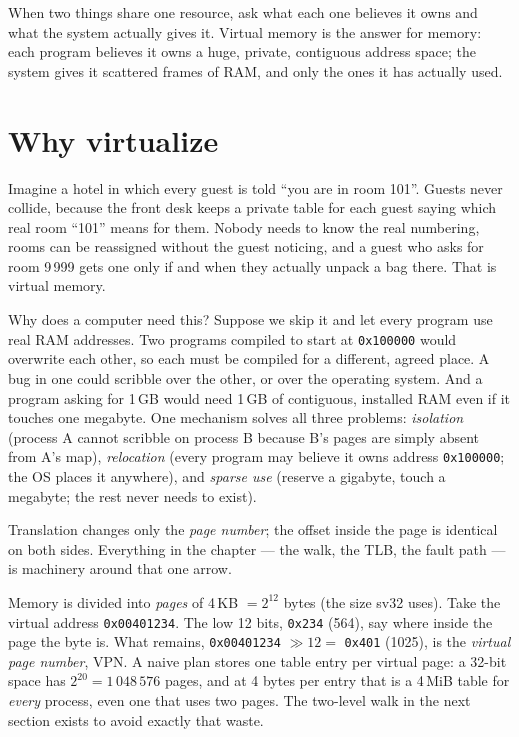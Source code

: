 \begin{rulebox}
When two things share one resource, ask what each one believes it owns
and what the system actually gives it. Virtual memory is the answer for
memory: each program believes it owns a huge, private, contiguous
address space; the system gives it scattered frames of RAM, and only the
ones it has actually used.
\end{rulebox}

\section{Why virtualize}
\label{sec:why11}

Imagine a hotel in which every guest is told ``you are in room 101''.
Guests never collide, because the front desk keeps a private table for
each guest saying which real room ``101'' means for them. Nobody needs
to know the real numbering, rooms can be reassigned without the guest
noticing, and a guest who asks for room 9\,999 gets one only if and when
they actually unpack a bag there. That is virtual memory.

Why does a computer need this? Suppose we skip it and let every program
use real RAM addresses. Two programs compiled to start at
\texttt{0x100000} would overwrite each other, so each must be compiled
for a different, agreed place. A bug in one could scribble over the
other, or over the operating system. And a program asking for 1\,GB
would need 1\,GB of contiguous, installed RAM even if it touches one
megabyte. One mechanism solves all three problems: \emph{isolation}
(process A cannot scribble on process B because B's pages are simply
absent from A's map), \emph{relocation} (every program may believe it
owns address \texttt{0x100000}; the OS places it anywhere), and
\emph{sparse use} (reserve a gigabyte, touch a megabyte; the rest never
needs to exist).



\begin{example}
Translation changes only the \emph{page number}; the offset inside
the page is identical on both sides. Everything in the chapter ---
the walk, the TLB, the fault path --- is machinery around that one
arrow.
\end{example}

\begin{example}
Memory is divided into \emph{pages} of 4\,KB \(=2^{12}\) bytes (the size
sv32 uses). Take the virtual address \texttt{0x00401234}. The low 12
bits, \texttt{0x234} (564), say where inside the page the byte is. What
remains, \texttt{0x00401234} \(\gg 12 =\) \texttt{0x401} (1025), is the
\emph{virtual page number}, VPN. A naive plan stores one table entry
per virtual page: a 32-bit space has \(2^{20}=1\,048\,576\) pages,
and at 4 bytes per entry that is a 4\,MiB table for \emph{every}
process, even one that uses two pages. The two-level walk in the next
section exists to avoid exactly that waste.
\end{example}

